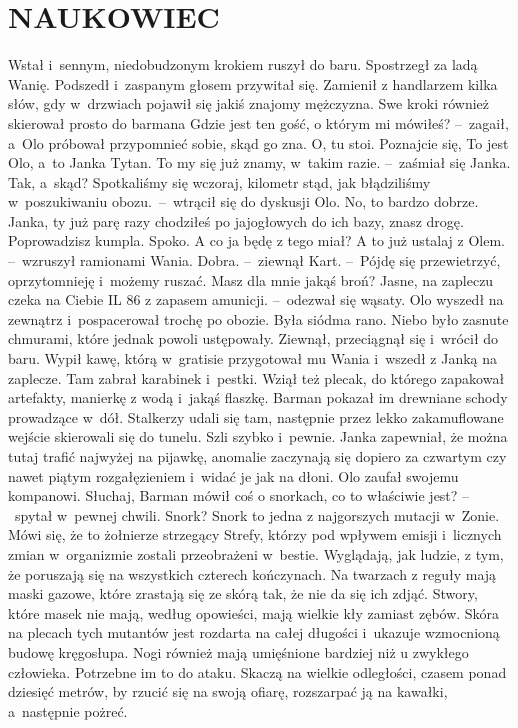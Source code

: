 \documentclass[../MAIN.tex]{subfiles}
\begin{document}
\section*{NAUKOWIEC}
\mm Wstał i~sennym, niedobudzonym krokiem ruszył do baru. Spostrzegł za ladą Wanię. Podszedł i~zaspanym głosem przywitał się. Zamienił z handlarzem kilka słów, gdy w~drzwiach pojawił się jakiś znajomy mężczyzna. Swe kroki również skierował prosto do barmana
\sx Gdzie jest ten gość, o którym mi mówiłeś? --~zagaił, a~Olo próbował przypomnieć sobie, skąd go zna.
\xx O, tu stoi. Poznajcie się, To jest Olo, a~to Janka Tytan.
\xx To my się już znamy, w~takim razie. --~zaśmiał się Janka.
\xx Tak, a~skąd?
\xx Spotkaliśmy się wczoraj, kilometr stąd, jak błądziliśmy w~poszukiwaniu obozu.~--~wtrącił się do dyskusji Olo.
\xx No, to bardzo dobrze. Janka, ty już parę razy chodziłeś po jajogłowych do ich bazy, znasz drogę. Poprowadzisz kumpla.
\xx Spoko. A co ja będę z tego miał?
\xx A to już ustalaj z Olem. --~wzruszył ramionami Wania.
\xx Dobra. --~ziewnął Kart. --~Pójdę się przewietrzyć, oprzytomnieję i~możemy ruszać. Masz dla mnie jakąś broń?
\xx Jasne, na zapleczu czeka na Ciebie IL 86 z zapasem amunicji. --~odezwał się wąsaty.
\qm
Olo wyszedł na zewnątrz i~pospacerował trochę po obozie. Była siódma rano. Niebo było zasnute chmurami, które jednak powoli ustępowały. Ziewnął, przeciągnął się i~wrócił do baru. Wypił kawę, którą w~gratisie przygotował mu Wania i~wszedł z Janką na zaplecze. Tam zabrał karabinek i~pestki. Wziął też plecak, do którego zapakował artefakty, manierkę z wodą i~jakąś flaszkę. Barman pokazał im drewniane schody prowadzące w~dół. Stalkerzy udali się tam, następnie przez lekko zakamuflowane wejście skierowali się do tunelu. Szli szybko i~pewnie. Janka zapewniał, że można tutaj trafić najwyżej na pijawkę, anomalie zaczynają się dopiero za czwartym czy nawet piątym rozgałęzieniem i~widać je jak na dłoni. Olo zaufał swojemu kompanowi.
\sx Słuchaj, Barman mówił coś o snorkach, co to właściwie jest? --~spytał w~pewnej chwili.
\xx Snork? Snork to jedna z najgorszych mutacji w~Zonie. Mówi się, że to żołnierze strzegący Strefy, którzy pod wpływem emisji i~licznych zmian w~organizmie zostali przeobrażeni w~bestie. Wyglądają, jak ludzie, z tym, że poruszają się na wszystkich czterech kończynach. Na twarzach z reguły mają maski gazowe, które zrastają się ze skórą tak, że nie da się ich zdjąć. Stwory, które masek nie mają, według opowieści, mają wielkie kły zamiast zębów. Skóra na plecach tych mutantów jest rozdarta na całej długości i~ukazuje wzmocnioną budowę kręgosłupa. Nogi również mają umięśnione bardziej niż u zwykłego człowieka. Potrzebne im to do ataku. Skaczą na wielkie odległości, czasem ponad dziesięć metrów, by rzucić się na swoją ofiarę, rozszarpać ją na kawałki, a~następnie pożreć.
\end{document}
